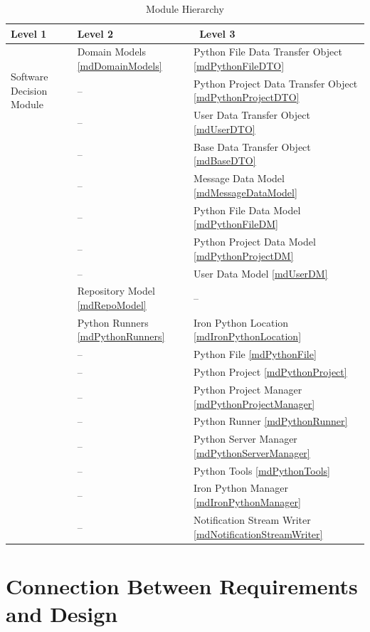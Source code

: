 \documentclass[12pt, titlepage]{article}
\begin{document}
\begin{table}[h!]
\centering
\begin{tabular}{p{} p{} p{}}
\toprule
    \textbf{Level 1} & \textbf{Level 2} &\ \textbf{Level 3}\\
\midrule
    \multirow{3}{0.3\textwidth}{Software Decision Module} & Domain Models \ref{mdDomainModels}& Python File Data Transfer Object \ref{mdPythonFileDTO}\\
    & -- & Python Project Data Transfer Object \ref{mdPythonProjectDTO}\\
    & -- & User Data Transfer Object \ref{mdUserDTO}\\
    & -- & Base Data Transfer Object \ref{mdBaseDTO}\\
    & -- & Message Data Model \ref{mdMessageDataModel}\\
    & -- & Python File Data Model \ref{mdPythonFileDM}\\
    & -- & Python Project Data Model \ref{mdPythonProjectDM}\\
    & -- & User Data Model \ref{mdUserDM}\\
    & Repository Model \ref{mdRepoModel} & --\\
    & Python Runners \ref{mdPythonRunners} & Iron Python Location \ref{mdIronPythonLocation}\\
    & -- & Python File \ref{mdPythonFile}\\
    & -- & Python Project \ref{mdPythonProject}\\
    & -- & Python Project Manager \ref{mdPythonProjectManager}\\
    & -- & Python Runner \ref{mdPythonRunner}\\
    & -- & Python Server Manager \ref{mdPythonServerManager}\\
    & -- & Python Tools \ref{mdPythonTools}\\
    & -- & Iron Python Manager \ref{mdIronPythonManager}\\
    & -- & Notification Stream Writer \ref{mdNotificationStreamWriter}\\
\bottomrule
\end{tabular}
\caption{Module Hierarchy}
\label{TblMH}
\end{table}

\section{Connection Between Requirements and Design} \label{SecConnection}
\end{document}

